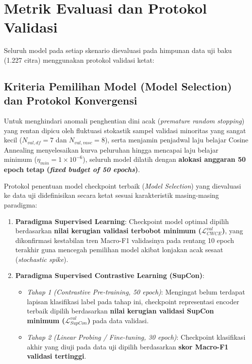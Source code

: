 \section{Metrik Evaluasi dan Protokol Validasi} \label{III.MetrikEvaluasi}
Seluruh model pada setiap skenario dievaluasi pada himpunan data uji baku (1.227 citra) menggunakan protokol validasi ketat:

\subsection{Kriteria Pemilihan Model (Model Selection) dan Protokol Konvergensi}
Untuk menghindari anomali penghentian dini acak (\textit{premature random stopping}) yang rentan dipicu oleh fluktuasi stokastik sampel validasi minoritas yang sangat kecil ($N_{val, df}=7$ dan $N_{val, vasc}=8$), serta menjamin penjadwal laju belajar Cosine Annealing menyelesaikan kurva peluruhan hingga mencapai laju belajar minimum ($\eta_{min} = 1 \times 10^{-6}$), seluruh model dilatih dengan \textbf{alokasi anggaran 50 epoch tetap (\textit{fixed budget of 50 epochs})}. \par

Protokol penentuan model checkpoint terbaik (\textit{Model Selection}) yang dievaluasi ke data uji didefinisikan secara ketat sesuai karakteristik masing-masing paradigma:
\begin{enumerate}[noitemsep]
	\item \textbf{Paradigma Supervised Learning}: Checkpoint model optimal dipilih berdasarkan \textbf{nilai kerugian validasi terbobot minimum ($\mathcal{L}_{CWCE}^{val}$)}, yang dikonfirmasi kestabilan tren Macro-F1 validasinya pada rentang 10 epoch terakhir guna mencegah pemilihan model akibat lonjakan acak sesaat (\textit{stochastic spike}).
	\item \textbf{Paradigma Supervised Contrastive Learning (SupCon)}:
	\begin{itemize}[noitemsep]
		\item \textit{Tahap 1 (Contrastive Pre-training, 50 epoch)}: Mengingat belum terdapat lapisan klasifikasi label pada tahap ini, checkpoint representasi encoder terbaik dipilih berdasarkan \textbf{nilai kerugian validasi SupCon minimum ($\mathcal{L}_{SupCon}^{val}$)} pada data validasi.
		\item \textit{Tahap 2 (Linear Probing / Fine-tuning, 30 epoch)}: Checkpoint klasifikasi akhir yang diuji pada data uji dipilih berdasarkan \textbf{skor Macro-F1 validasi tertinggi}.
	\end{itemize}
\end{enumerate}

